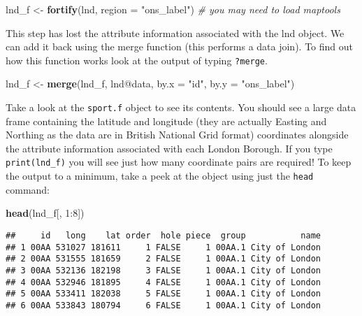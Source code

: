 \documentclass[]{article}
\newenvironment{Shaded}{}{}
\newcommand{\KeywordTok}[1]{\textcolor[rgb]{0.00,0.44,0.13}{\textbf{{#1}}}}
\newcommand{\DataTypeTok}[1]{\textcolor[rgb]{0.56,0.13,0.00}{{#1}}}
\newcommand{\DecValTok}[1]{\textcolor[rgb]{0.25,0.63,0.44}{{#1}}}
\newcommand{\StringTok}[1]{\textcolor[rgb]{0.25,0.44,0.63}{{#1}}}
\newcommand{\CommentTok}[1]{\textcolor[rgb]{0.38,0.63,0.69}{\textit{{#1}}}}
\newcommand{\NormalTok}[1]{{#1}}
\begin{document}
\begin{Shaded}
\begin{Highlighting}[]
\NormalTok{lnd_f <-}\StringTok{ }\KeywordTok{fortify}\NormalTok{(lnd, }\DataTypeTok{region =} \StringTok{"ons_label"}\NormalTok{) }\CommentTok{# you may need to load maptools}
\end{Highlighting}
\end{Shaded}

This step has lost the attribute information associated with the lnd
object. We can add it back using the merge function (this performs a
data join). To find out how this function works look at the output of
typing \texttt{?merge}.

\begin{Shaded}
\begin{Highlighting}[]
\NormalTok{lnd_f <-}\StringTok{ }\KeywordTok{merge}\NormalTok{(lnd_f, lnd@data, }\DataTypeTok{by.x =} \StringTok{"id"}\NormalTok{, }\DataTypeTok{by.y =} \StringTok{"ons_label"}\NormalTok{)}
\end{Highlighting}
\end{Shaded}

Take a look at the \texttt{sport.f} object to see its contents. You
should see a large data frame containing the latitude and longitude
(they are actually Easting and Northing as the data are in British
National Grid format) coordinates alongside the attribute information
associated with each London Borough. If you type \texttt{print(lnd\_f)}
you will see just how many coordinate pairs are required! To keep the
output to a minimum, take a peek at the object using just the
\texttt{head} command:

\begin{Shaded}
\begin{Highlighting}[]
\KeywordTok{head}\NormalTok{(lnd_f[, }\DecValTok{1}\NormalTok{:}\DecValTok{8}\NormalTok{])}
\end{Highlighting}
\end{Shaded}

\begin{verbatim}
##     id   long    lat order  hole piece  group           name
## 1 00AA 531027 181611     1 FALSE     1 00AA.1 City of London
## 2 00AA 531555 181659     2 FALSE     1 00AA.1 City of London
## 3 00AA 532136 182198     3 FALSE     1 00AA.1 City of London
## 4 00AA 532946 181895     4 FALSE     1 00AA.1 City of London
## 5 00AA 533411 182038     5 FALSE     1 00AA.1 City of London
## 6 00AA 533843 180794     6 FALSE     1 00AA.1 City of London
\end{verbatim}
\end{document}
